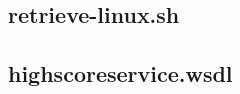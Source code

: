 \documentclass[a4paper, 12pt]{article}
\begin{document}
\newpage
\subsection{retrieve-linux.sh}\label{etrieve-linux.sh}
\begin{footnotesize}
  
\end{footnotesize}

\newpage
\subsection{highscoreservice.wsdl}\label{highscoreservice.wsdl}
\begin{footnotesize}
  
\end{footnotesize}
\end{document}
